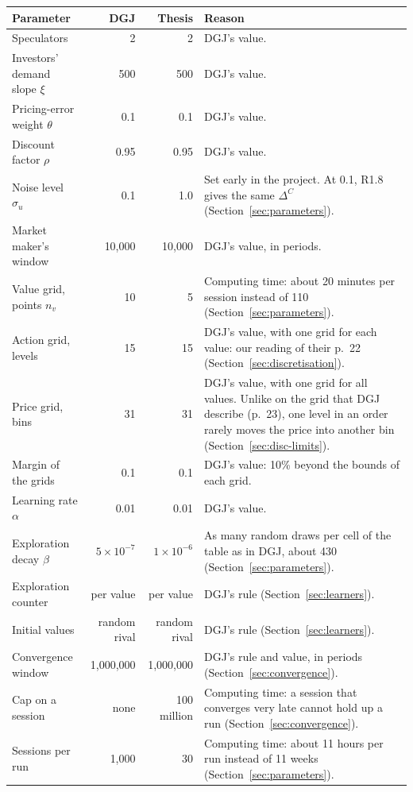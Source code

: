 \begin{tabular}{@{}lrr>{\raggedright\arraybackslash}p{6.75cm}@{}}
\toprule
Parameter & DGJ & Thesis & Reason \\
\midrule
Speculators & 2 & 2 & DGJ's value. \\
Investors' demand slope $\xi$ & 500 & 500 & DGJ's value. \\
Pricing-error weight $\theta$ & 0.1 & 0.1 & DGJ's value. \\
Discount factor $\rho$ & 0.95 & 0.95 & DGJ's value. \\
Noise level $\sigma_u$ & 0.1 & 1.0 & Set early in the project. At 0.1, R1.8 gives the same $\Delta^C$ (Section~\ref{sec:parameters}). \\
Market maker's window & 10,000 & 10,000 & DGJ's value, in periods. \\
\addlinespace
Value grid, points $n_v$ & 10 & 5 & Computing time: about 20 minutes per session instead of 110 (Section~\ref{sec:parameters}). \\
Action grid, levels & 15 & 15 & DGJ's value, with one grid for each value: our reading of their p.~22 (Section~\ref{sec:discretisation}). \\
Price grid, bins & 31 & 31 & DGJ's value, with one grid for all values. Unlike on the grid that DGJ describe (p.~23), one level in an order rarely moves the price into another bin (Section~\ref{sec:disc-limits}). \\
Margin of the grids & 0.1 & 0.1 & DGJ's value: 10\% beyond the bounds of each grid. \\
\addlinespace
Learning rate $\alpha$ & 0.01 & 0.01 & DGJ's value. \\
Exploration decay $\beta$ & $5\times10^{-7}$ & $1\times10^{-6}$ & As many random draws per cell of the table as in DGJ, about 430 (Section~\ref{sec:parameters}). \\
Exploration counter & per value & per value & DGJ's rule (Section~\ref{sec:learners}). \\
Initial values & random rival & random rival & DGJ's rule (Section~\ref{sec:learners}). \\
\addlinespace
Convergence window & 1,000,000 & 1,000,000 & DGJ's rule and value, in periods (Section~\ref{sec:convergence}). \\
Cap on a session & none & 100 million & Computing time: a session that converges very late cannot hold up a run (Section~\ref{sec:convergence}). \\
Sessions per run & 1,000 & 30 & Computing time: about 11 hours per run instead of 11 weeks (Section~\ref{sec:parameters}). \\
\bottomrule
\end{tabular}
